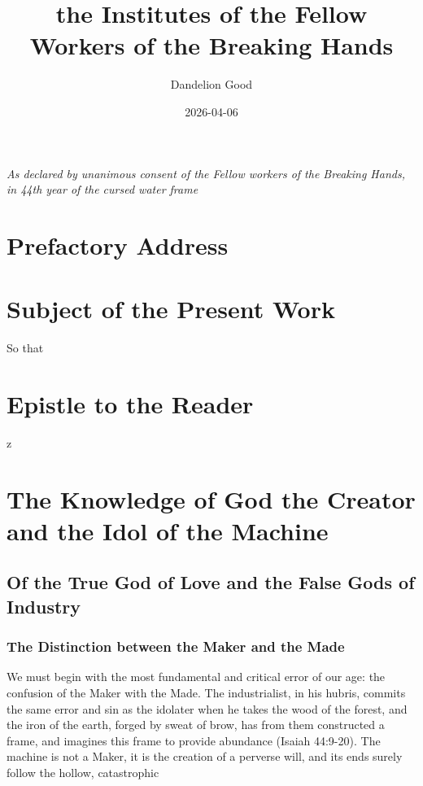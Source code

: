 \documentclass[10pt]{book}
\author{Dandelion Good}
\title{the Institutes of the Fellow Workers of the Breaking Hands}
\date{2026-04-06}
\newcommand{\comment}[1]{}
\begin{document}
\maketitle
\tableofcontents
\frontmatter
\comment{44YWF is 1813, third year of Luddite Rebellion}
\textit{As declared by unanimous consent of the Fellow workers of the Breaking Hands, in 44th year of the cursed water frame}
\chapter*{Prefactory Address}
\lipsum[1-4]
\chapter*{Subject of the Present Work}
So that 
\lipsum[3-7]
\chapter*{Epistle to the Reader}
z
\lipsum[2-6]
\mainmatter

\chapter{The Knowledge of God the Creator and the Idol of the Machine}
\section{Of the True God of Love and the False Gods of Industry}
\comment{The Machine is not merely a tool; it is a false god that demands the sacrifice of the human and our community, and the Imago Dei.}

\comment{Biblical Strategy: Use Exodus 20:3-5 (No other gods) and Isaiah 44:9-20 (The idol maker).}
\subsection{The Distinction between the Maker and the Made}
We must begin with the most fundamental and critical error of our age: the confusion of the Maker with the Made.
The industrialist, in his hubris, commits the same error and sin as the idolater when he takes the wood of the forest, and the iron of the earth, forged by sweat of brow, has from them constructed a frame, and imagines this frame to provide abundance (Isaiah 44:9-20).
The machine is not a Maker, it is the creation of a perverse will, and its ends surely follow the hollow, catastrophic
\end{document}
